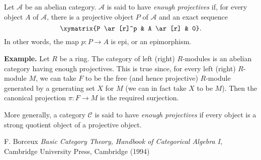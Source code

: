 \documentclass[12pt]{article}
\begin{document}
Let $\mathcal{A}$ be an abelian category.  $\mathcal{A}$ is said to have \emph{enough projectives} if, for every object $A$ of $\mathcal{A}$, there is a projective object $P$ of $\mathcal{A}$ and an exact sequence 
$$\xymatrix{P \ar[r]^p & A \ar[r] & 0}.$$  In other words, the map $p\colon P \to A$ is epi, or an epimorphism.

\textbf{Example.}  Let $R$ be a ring.  The category of left (right) $R$-modules is an abelian category having enough projectives.  This is true since, for every left (right) $R$-module $M$, we can take $F$ to be the free (and hence projective) $R$-module generated by a generating set $X$ for $M$ (we can in fact take $X$ to be $M$).  Then the canonical projection $\pi\colon F\to M$ is the required surjection.

More generally, a category $\mathcal{C}$ is said to have \emph{enough projectives} if every object is a strong quotient object of a projective object.


\begin{thebibliography}{9}
 F. Borceux \emph{Basic Category Theory, Handbook of Categorical Algebra I}, Cambridge University Press, Cambridge (1994)
\end{thebibliography}
\end{document}
